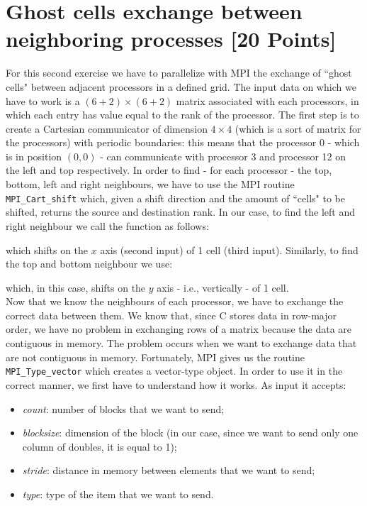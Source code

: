 \documentclass[unicode,11pt,a4paper,oneside,numbers=endperiod,openany]{scrartcl}
\begin{document}
\section{Ghost cells exchange between neighboring processes [20 Points]}
For this second exercise we have to parallelize with MPI the exchange of ``ghost cells" between adjacent processors in a defined grid. The input data on which we have to work is a $(6+2)\times(6+2)$ matrix associated with each processors, in which each entry has value equal to the rank of the processor. 
The first step is to create a Cartesian communicator of dimension $4\times 4$ (which is a sort of matrix for the processors) with periodic boundaries: this means that the processor 0 - which is in position $(0,0)$ - can communicate with processor 3 and processor 12 on the left and top respectively. In order to find - for each processor - the top, bottom, left and right neighbours, we have to use the MPI routine \texttt{MPI\_Cart\_shift} which, given a shift direction and the amount of ``cells" to be shifted, returns the source and destination rank. In our case, to find the left and right neighbour we call the function as follows:


which shifts on the $x$ axis (second input) of 1 cell (third input). Similarly, to find the top and bottom neighbour we use:

which, in this case, shifts on the $y$ axis - i.e., vertically - of 1 cell.\\ Now that we know the neighbours of each processor, we have to exchange the correct data between them. We know that, since C stores data in row-major order, we have no problem in exchanging rows of a matrix because the data are contiguous in memory. The problem occurs when we want to exchange data that are not contiguous in memory. Fortunately, MPI gives us the routine \texttt{MPI\_Type\_vector} which creates a vector-type object. In order to use it in the correct manner, we first have to understand how it works. As input it accepts:

\begin{itemize}
	\item \textit{count}: number of blocks that we want to send;
	\item \textit{blocksize}: dimension of the block (in our case, since we want to send only one column of doubles, it is equal to 1);
	\item \textit{stride}: distance in memory between elements that we want to send;
	\item \textit{type}: type of the item that we want to send.
\end{itemize}
\end{document}

